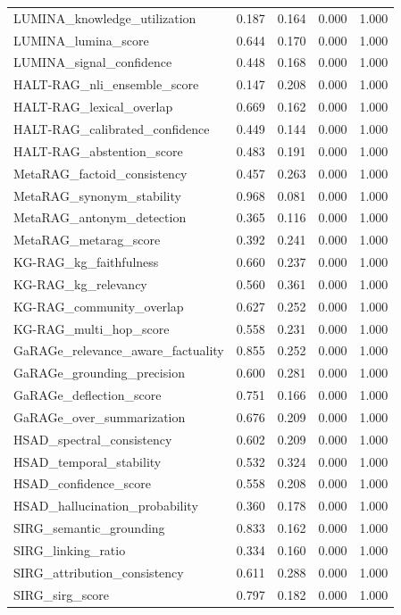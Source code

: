 \begin{table}
\begin{tabular}{lrrrr}
LUMINA_knowledge_utilization & 0.187 & 0.164 & 0.000 & 1.000 \\
LUMINA_lumina_score & 0.644 & 0.170 & 0.000 & 1.000 \\
LUMINA_signal_confidence & 0.448 & 0.168 & 0.000 & 1.000 \\
HALT-RAG_nli_ensemble_score & 0.147 & 0.208 & 0.000 & 1.000 \\
HALT-RAG_lexical_overlap & 0.669 & 0.162 & 0.000 & 1.000 \\
HALT-RAG_calibrated_confidence & 0.449 & 0.144 & 0.000 & 1.000 \\
HALT-RAG_abstention_score & 0.483 & 0.191 & 0.000 & 1.000 \\
MetaRAG_factoid_consistency & 0.457 & 0.263 & 0.000 & 1.000 \\
MetaRAG_synonym_stability & 0.968 & 0.081 & 0.000 & 1.000 \\
MetaRAG_antonym_detection & 0.365 & 0.116 & 0.000 & 1.000 \\
MetaRAG_metarag_score & 0.392 & 0.241 & 0.000 & 1.000 \\
KG-RAG_kg_faithfulness & 0.660 & 0.237 & 0.000 & 1.000 \\
KG-RAG_kg_relevancy & 0.560 & 0.361 & 0.000 & 1.000 \\
KG-RAG_community_overlap & 0.627 & 0.252 & 0.000 & 1.000 \\
KG-RAG_multi_hop_score & 0.558 & 0.231 & 0.000 & 1.000 \\
GaRAGe_relevance_aware_factuality & 0.855 & 0.252 & 0.000 & 1.000 \\
GaRAGe_grounding_precision & 0.600 & 0.281 & 0.000 & 1.000 \\
GaRAGe_deflection_score & 0.751 & 0.166 & 0.000 & 1.000 \\
GaRAGe_over_summarization & 0.676 & 0.209 & 0.000 & 1.000 \\
HSAD_spectral_consistency & 0.602 & 0.209 & 0.000 & 1.000 \\
HSAD_temporal_stability & 0.532 & 0.324 & 0.000 & 1.000 \\
HSAD_confidence_score & 0.558 & 0.208 & 0.000 & 1.000 \\
HSAD_hallucination_probability & 0.360 & 0.178 & 0.000 & 1.000 \\
SIRG_semantic_grounding & 0.833 & 0.162 & 0.000 & 1.000 \\
SIRG_linking_ratio & 0.334 & 0.160 & 0.000 & 1.000 \\
SIRG_attribution_consistency & 0.611 & 0.288 & 0.000 & 1.000 \\
SIRG_sirg_score & 0.797 & 0.182 & 0.000 & 1.000 \\
\bottomrule
\end{tabular}
\end{table}


